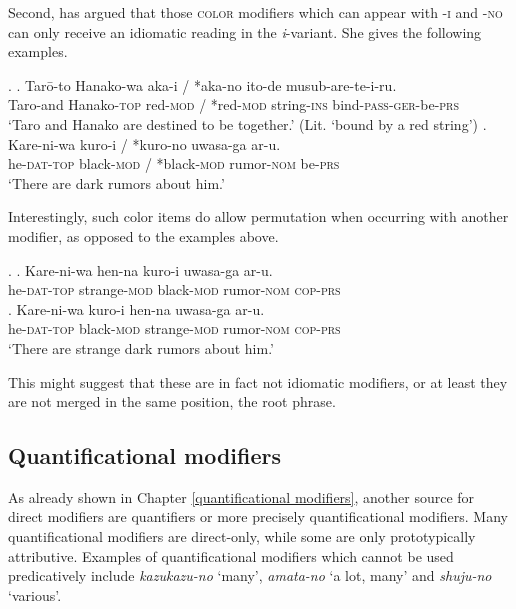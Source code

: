 \documentclass [output=book,colorlinks,citecolor=brown]{langscibook}
\begin{document}
Second, \citet{okami:2012:two} has argued that those \textsc{color} modifiers which can appear with -\textsc{i} and -\textsc{no} can only receive an idiomatic reading in the \textit{i}-variant. She gives the following examples.

\ex. \ag. Tarō-to Hanako-wa aka-i / *aka-no ito-de musub-are-te-i-ru.\\
Taro-and Hanako-\textsc{top} red-\textsc{mod} / *red-\textsc{mod} string-\textsc{ins} bind-\textsc{pass-ger}-be-\textsc{prs}\\
`Taro and Hanako are destined to be together.’ (Lit. `bound by a red string’)
\bg. Kare-ni-wa kuro-i / *kuro-no uwasa-ga ar-u.\\
he-\textsc{dat-top} black-\textsc{mod} / *black-\textsc{mod} rumor-\textsc{nom} be-\textsc{prs}\\
`There are dark rumors about him.’ \hfill \citep[96]{okami:2012:two}

Interestingly, such color items do allow permutation when occurring with another modifier, as opposed to the examples above.


\ex. \ag. Kare-ni-wa hen-na kuro-i uwasa-ga ar-u.\\
he-\textsc{dat-top} strange-\textsc{mod} black-\textsc{mod} rumor-\textsc{nom} \textsc{cop-prs}\\
\bg. Kare-ni-wa kuro-i hen-na uwasa-ga ar-u.\\
he-\textsc{dat-top} black-\textsc{mod} strange-\textsc{mod} rumor-\textsc{nom} \textsc{cop-prs}\\
`There are strange dark rumors about him.’

This might suggest that these are in fact not idiomatic modifiers, or at least they are not merged in the same position, the root phrase.

\subsection{Quantificational modifiers}

As already shown in Chapter \ref{quantificational modifiers}, another source for direct modifiers are quantifiers or more precisely quantificational modifiers. Many quantificational modifiers are direct-only, while some are only prototypically attributive. Examples of quantificational modifiers which cannot be used predicatively include \textit{kazukazu-no} `many’, \textit{amata-no} `a lot, many’ and \textit{shuju-no} `various’. %
\end{document}
